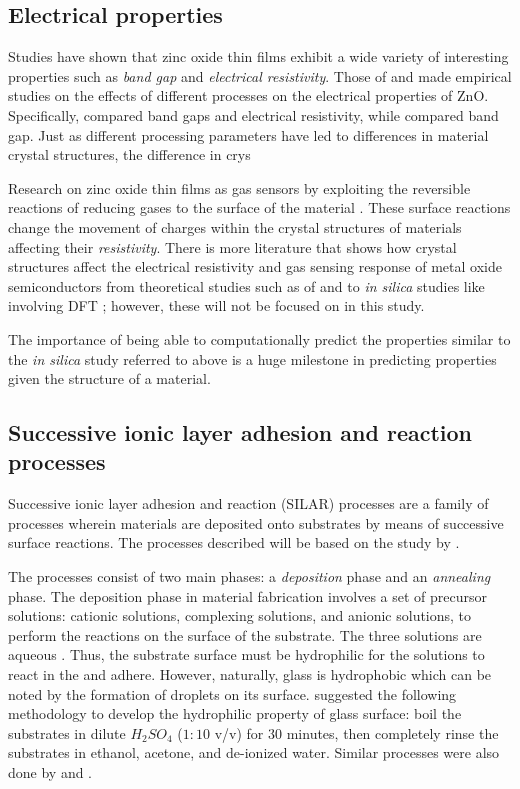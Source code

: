 \subsection{Electrical properties}

Studies have shown that zinc oxide thin films exhibit a wide variety of interesting properties such as  \emph{band gap} and \emph{electrical resistivity}.
Those of  and  made empirical studies on the effects of different processes on the electrical properties of ZnO.
Specifically,  compared band gaps and electrical resistivity, while  compared band gap.
Just as different processing parameters have led to differences in material crystal structures, the difference in crys

Research on zinc oxide thin films as gas sensors by exploiting the reversible reactions of reducing gases to the surface of the material \cite{florido17}.
These surface reactions change the movement of charges within the crystal structures of materials affecting their \emph{resistivity}.
There is more literature that shows how crystal structures affect the electrical resistivity and gas sensing response of metal oxide semiconductors from theoretical studies such as of  and  to \textit{in silica} studies like involving DFT \cite{dft}; however, these will not be focused on in this study.

The importance of being able to computationally predict the properties similar to the \textit{in silica} study referred to above is a huge milestone in predicting properties given the structure of a material.

\subsection{Successive ionic layer adhesion and reaction processes}

Successive ionic layer adhesion and reaction (SILAR) processes are a family of processes wherein materials are deposited onto substrates by means of successive surface reactions.
The processes described will be based on the study by .

The processes consist of two main phases: a \emph{deposition} phase and an \emph{annealing} phase.
The deposition phase in material fabrication involves a set of precursor solutions: cationic solutions, complexing solutions, and anionic solutions, to perform the reactions on the surface of the substrate.
The three solutions are aqueous \cite{gao08}.
Thus, the substrate surface must be hydrophilic for the solutions to react in the and adhere.
However, naturally, glass is hydrophobic which can be noted by the formation of droplets on its surface.
 suggested the following methodology to develop the hydrophilic property of glass surface: boil the substrates in dilute $H_2SO_4$ ($1:10$ v/v) for $30$ minutes, then completely rinse the substrates in ethanol, acetone, and de-ionized water.
Similar processes were also done by  and .

